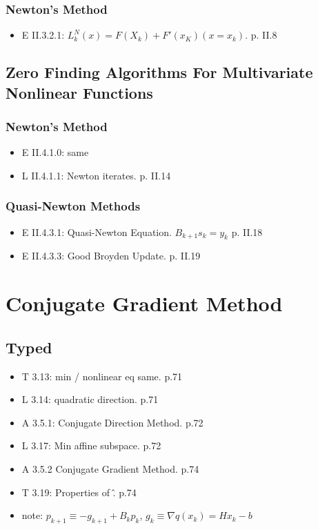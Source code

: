 \documentclass[11pt]{article}
\begin{document}
  \subsubsection{Newton's Method}
  \label{subsub:newton_s_method}
    \begin{itemize}
      \item E II.3.2.1: $L_k^N(x) = F(X_k) + F'(x_K)(x = x_k)$. p. II.8
    \end{itemize}

\subsection{Zero Finding Algorithms For Multivariate Nonlinear Functions}
\label{sub:zero_finding_algorithms_for_multivariate_nonlinear_functions}

  \subsubsection{Newton's Method}
  \label{subsub:newton_s_method}
  \begin{itemize}
    \item E II.4.1.0: same
    \item L II.4.1.1: Newton iterates. p. II.14
  \end{itemize}

  \subsubsection{Quasi-Newton Methods}
  \label{subsub:quasi_newton_methods}

  \begin{itemize}
    \item E II.4.3.1: Quasi-Newton Equation. $B_{k+1}s_k = y_k$ p. II.18
    \item E II.4.3.3: Good Broyden Update. p. II.19
  \end{itemize}
\section{Conjugate Gradient Method}
\label{sec:conjugate_gradient_method}
\subsection{Typed}
\label{sub:typed}
  \begin{itemize}
    \item T 3.13: min / nonlinear eq same. p.71
    \item L 3.14: quadratic direction. p.71
    \item A 3.5.1: Conjugate Direction Method. p.72
    \item L 3.17: Min affine subspace. p.72
    \item A 3.5.2 Conjugate Gradient Method. p.74
    \item T 3.19: Properties of \^. p.74
    \item note: $p_{k+1} \equiv -g_{k+1} + B_k p_k$, $g_k \equiv \nabla q(x_k) = H x_k - b$
  \end{itemize}
\end{document}
